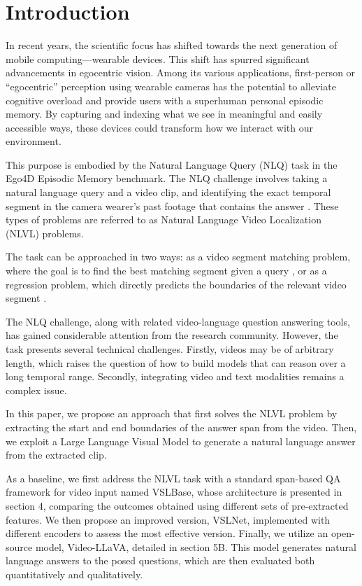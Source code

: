 \documentclass[10pt,twocolumn,letterpaper]{article}
\begin{document}
\section{Introduction}
In recent years, the scientific focus has shifted towards the next generation of mobile computing—wearable devices. This shift has spurred significant advancements in egocentric vision. Among its various applications, first-person or “egocentric” perception using wearable cameras has the potential to alleviate cognitive overload and provide users with a superhuman personal episodic memory. By capturing and indexing what we see in meaningful and easily accessible ways, these devices could transform how we interact with our environment.

This purpose is embodied by the Natural Language Query (NLQ) task in the Ego4D Episodic Memory benchmark. The NLQ challenge involves taking a natural language query and a video clip, and identifying the exact temporal segment in the camera wearer's past footage that contains the answer \cite{b1}. These types of problems are referred to as Natural Language Video Localization (NLVL) problems.

The task can be approached in two ways: as a video segment matching problem, where the goal is to find the best matching segment given a query \cite{b2}, or as a regression problem, which directly predicts the boundaries of the relevant video segment \cite{b3}.

The NLQ challenge, along with related video-language question answering tools, has gained considerable attention from the research community. However, the task presents several technical challenges. Firstly, videos may be of arbitrary length, which raises the question of how to build models that can reason over a long temporal range. Secondly, integrating video and text modalities remains a complex issue.

In this paper, we propose an approach that first solves the NLVL problem by extracting the start and end boundaries of the answer span from the video. Then, we exploit a Large Language Visual Model to generate a natural language answer from the extracted clip.

As a baseline, we first address the NLVL task with a standard span-based QA framework for video input named VSLBase, whose architecture is presented in section 4, comparing the outcomes obtained using different sets of pre-extracted features. We then propose an improved version, VSLNet, implemented with different encoders to assess the most effective version. Finally, we utilize an open-source model, Video-LLaVA, detailed in section 5B. This model generates natural language answers to the posed questions, which are then evaluated both quantitatively and qualitatively.
\end{document}
